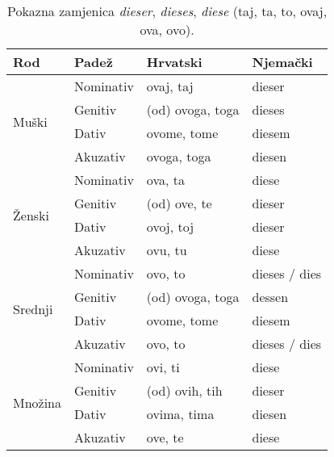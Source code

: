 \documentclass[12pt,german]{article}
\begin{document}
\begin{multicols}{2}
\begin{table}[H]
  \caption{Pokazna zamjenica \emph{dieser}, \emph{dieses}, \emph{diese} (taj,
  ta, to, ovaj, ova, ovo).}
\begin{tabular}{@{} llll @{}}
  \toprule
  Rod & Padež & Hrvatski & Njemački \\
  \midrule
  \multirow{4}{3mm}{\begin{sideways}\parbox{12mm}{Muški}\end{sideways}}
  & Nominativ & ovaj, taj & dieser \\
  & Genitiv & (od) ovoga, toga & dieses \\
  & Dativ & ovome, tome & diesem \\
  & Akuzativ & ovoga, toga & diesen \\
  \midrule
  \multirow{4}{3mm}{\begin{sideways}\parbox{12mm}{Ženski}\end{sideways}}
  & Nominativ & ova, ta & diese \\
  & Genitiv & (od) ove, te & dieser \\
  & Dativ & ovoj, toj & dieser \\
  & Akuzativ & ovu, tu & diese \\
  \midrule
  \multirow{4}{3mm}{\begin{sideways}\parbox{15mm}{Srednji}\end{sideways}}
  & Nominativ & ovo, to & dieses / dies \\
  & Genitiv & (od) ovoga, toga & dessen  \\
  & Dativ & ovome, tome & diesem \\
  & Akuzativ & ovo, to & dieses / dies \\
  \midrule
  \multirow{4}{3mm}{\begin{sideways}\parbox{15mm}{Množina}\end{sideways}}
  & Nominativ & ovi, ti & diese \\
  & Genitiv & (od) ovih, tih & dieser \\
  & Dativ & ovima, tima & diesen \\
  & Akuzativ & ove, te & diese \\
  \bottomrule
\end{tabular}
\end{table}


\end{multicols}
\end{document}
